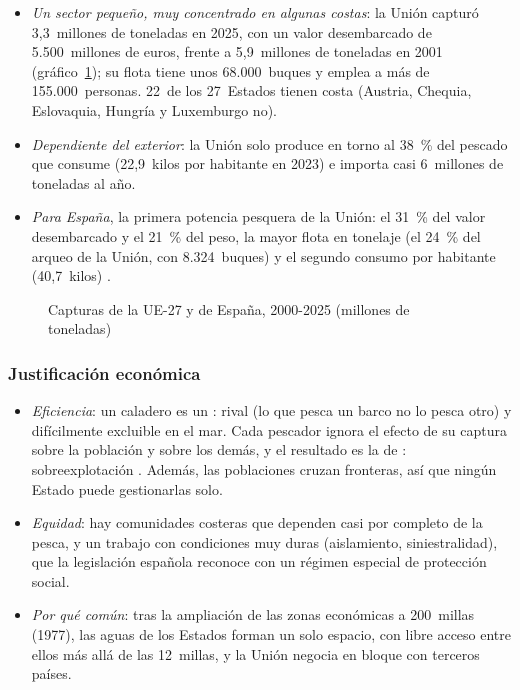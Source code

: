 \documentclass[11pt]{article}
\begin{document}
\begin{itemize}
\item \emph{Un sector pequeño, muy concentrado en algunas costas}: la Unión capturó 3,3~millones de toneladas en 2025, con un valor desembarcado de 5.500~millones de euros, frente a 5,9~millones de toneladas en 2001 (gráfico~\ref{fig:capturas}); su flota tiene unos 68.000~buques y emplea a más de 155.000~personas\nocite{Eurostat2026Capturas,CE2026Pesca2027}. 22~de los 27~Estados tienen costa (Austria, Chequia, Eslovaquia, Hungría y Luxemburgo no).
\item \emph{Dependiente del exterior}: la Unión solo produce en torno al 38~\% del pescado que consume (22,9~kilos por habitante en 2023) e importa casi 6~millones de toneladas al año\nocite{EUMOFA2025}.
\item \emph{Para España}, la primera potencia pesquera de la Unión: el 31~\% del valor desembarcado y el 21~\% del peso, la mayor flota en tonelaje (el 24~\% del arqueo de la Unión, con 8.324~buques) y el segundo consumo por habitante (40,7~kilos)\nocite{Eurostat2026Capturas,Eurostat2026Flota,EUMOFA2025} .
\end{itemize}

\begin{figure}[H]
\centering
\caption{Capturas de la UE-27 y de España, 2000-2025 (millones de toneladas)}\label{fig:capturas}
\end{figure}

\subsubsection{Justificación económica}\label{sec:justificacion-pesca}

\begin{itemize}
\item \emph{Eficiencia}: un caladero es un : rival (lo que pesca un barco no lo pesca otro) y difícilmente excluible en el mar. Cada pescador ignora el efecto de su captura sobre la población y sobre los demás, y el resultado es la  de \textcite{Hardin1968Tragedy}: sobreexplotación . Además, las poblaciones cruzan fronteras, así que ningún Estado puede gestionarlas solo.
\item \emph{Equidad}: hay comunidades costeras que dependen casi por completo de la pesca, y un trabajo con condiciones muy duras (aislamiento, siniestralidad), que la legislación española reconoce con un régimen especial de protección social\nocite{Ley47_2015}.
\item \emph{Por qué común}: tras la ampliación de las zonas económicas a 200~millas (1977), las aguas de los Estados forman un solo espacio, con libre acceso entre ellos más allá de las 12~millas, y la Unión negocia en bloque con terceros países.
\end{itemize}
\end{document}
